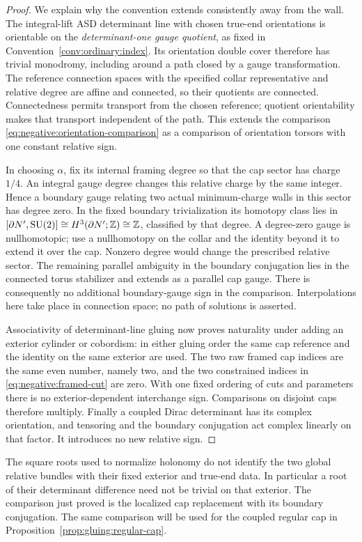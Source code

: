 \begin{proof}
We explain why the convention extends consistently away from the wall.
The integral-lift ASD determinant line with chosen true-end orientations
is orientable on the \emph{determinant-one gauge quotient}, as fixed in
Convention~\ref{conv:ordinary:index}.  Its orientation double cover
therefore has trivial monodromy, including around a path closed by a
gauge transformation.  The reference connection spaces with the
specified collar representative and relative degree are affine and
connected, so their quotients are connected.  Connectedness permits
transport from the chosen reference; quotient orientability makes that
transport independent of the path.  This extends the comparison
\eqref{eq:negative:orientation-comparison} as a comparison of
orientation torsors with one constant relative sign.

In choosing $\alpha$, fix its internal framing degree so that the cap
sector has charge $1/4$.  An integral gauge degree changes this relative
charge by the same integer.  Hence a boundary gauge relating two actual
minimum-charge walls in this sector has degree zero.  In the fixed
boundary trivialization its homotopy class lies in
$[\partial N',\operatorname{SU}(2)]\cong H^3(\partial N';\mathbb Z)\cong\mathbb Z$, classified
by that degree.  A degree-zero gauge is nullhomotopic; use a nullhomotopy
on the collar and the identity beyond it to extend it over the cap.
Nonzero degree would change the prescribed relative sector.  The
remaining parallel ambiguity in the boundary conjugation lies in the
connected torus stabilizer and extends as a parallel cap gauge.  There
is consequently no additional boundary-gauge sign in the comparison.
Interpolations here take place in connection space; no path of
solutions is asserted.

Associativity of determinant-line gluing now proves naturality under
adding an exterior cylinder or cobordism: in either gluing order the
same cap reference and the identity on the same exterior are used.
The two raw framed cap indices are the same even number, namely two,
and the two constrained indices in \eqref{eq:negative:framed-cut} are
zero.  With one fixed ordering of cuts and parameters there is no
exterior-dependent interchange sign.  Comparisons on disjoint caps
therefore multiply.  Finally a coupled Dirac determinant has its
complex orientation, and tensoring and the boundary conjugation act
complex linearly on that factor.  It introduces no new relative sign.
\end{proof}

The square roots used to normalize holonomy do not identify the two
global relative bundles with their fixed exterior and true-end data.
In particular a root of their determinant difference need not be
trivial on that exterior.  The comparison just proved is the localized
cap replacement with its boundary conjugation.  The same comparison
will be used for the coupled regular cap in
Proposition~\ref{prop:gluing:regular-cap}.

